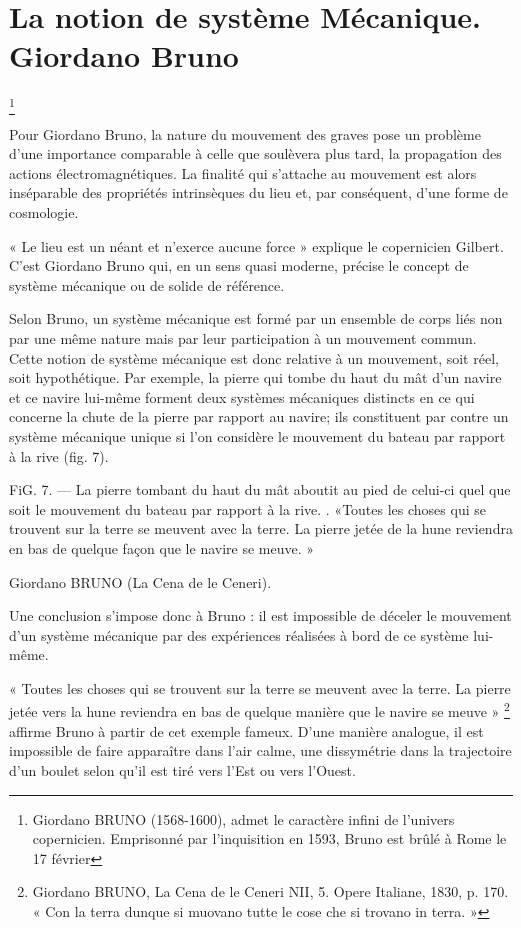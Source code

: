 \section{La notion de système Mécanique. Giordano Bruno}

\footnote{Giordano BRUNO (1568-1600), admet le caractère infini de l’univers copernicien. Emprisonné par l’inquisition en 1593, Bruno est brûlé à Rome le 17 février}

Pour Giordano Bruno, la nature du mouvement des graves pose un
problème d’une importance comparable à celle que soulèvera plus tard,
la propagation des actions électromagnétiques. La finalité qui s’attache
au mouvement est alors inséparable des propriétés intrinsèques du lieu
et, par conséquent, d’une forme de cosmologie.

« Le lieu est un néant et n’exerce aucune force » explique le copernicien
Gilbert. C’est Giordano Bruno qui, en un sens quasi moderne,
précise le concept de système mécanique ou de solide de référence.

Selon Bruno, un système mécanique est formé par un ensemble de
corps liés non par une même nature mais par leur participation à un
mouvement commun. Cette notion de système mécanique est donc
relative à un mouvement, soit réel, soit hypothétique. Par exemple, la
pierre qui tombe du haut du mât d’un navire et ce navire lui-même
forment deux systèmes mécaniques distincts en ce qui concerne la chute
de la pierre par rapport au navire; ils constituent par contre un système
mécanique unique si l’on considère le mouvement du bateau par rapport
à la rive (fig. 7).


FiG. 7. — La pierre tombant du haut du mât aboutit au pied de celui-ci
quel que soit le mouvement du bateau par rapport à la rive.
. «Toutes les choses qui se trouvent sur la terre se meuvent avec la terre. La
pierre jetée de la hune reviendra en bas de quelque façon que le navire se meuve. »

Giordano BRUNO (La Cena de le Ceneri).


Une conclusion s’impose donc à Bruno : il est impossible de déceler
le mouvement d’un système mécanique par des expériences réalisées à
bord de ce système lui-même.

« Toutes les choses qui se trouvent sur la terre se meuvent avec la
terre. La pierre jetée vers la hune reviendra en bas de quelque manière
que le navire se meuve » \footnote{Giordano BRUNO, La Cena de le Ceneri NII, 5. Opere Italiane, 1830, p. 170.
« Con la terra dunque si muovano tutte le cose che si trovano in terra. »} affirme Bruno à partir de cet exemple
fameux. D’une manière analogue, il est impossible de faire apparaître
dans l’air calme, une dissymétrie dans la trajectoire d’un boulet selon
qu'il est tiré vers l’Est ou vers l’Ouest.

